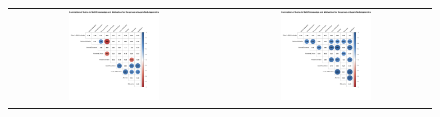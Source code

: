 \begin{figure}[htb]
\begin{tabular}{cc}
 \includegraphics[width=0.45\textwidth]{images/chap-evaluation/corr-effective-third/wo-gamifiedApprentice1.png}&
 \includegraphics[width=0.45\textwidth]{images/chap-evaluation/corr-effective-third/ont-gamifiedApprentice1.png}
 \end{tabular}
 \fautor
\end{figure}


